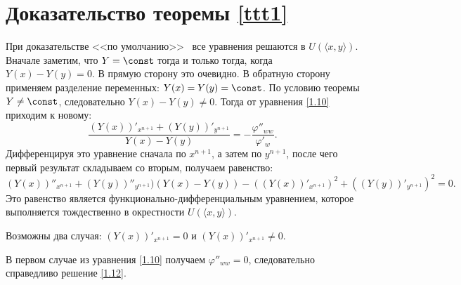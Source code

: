 \section{Доказательство теоремы \ref{ttt1}}
При доказательстве <<по умолчанию>> \ все уравнения решаются в $U(\langle x,y\rangle)$. Вначале заметим, что $Y=\const$ тогда и только тогда, когда $Y(x) - Y(y)=0$. В прямую сторону это очевидно. В обратную сторону применяем разделение переменных: $Y(x) = Y(y)=\const$.
По условию теоремы $Y\ne\const$, следовательно $Y(x) - Y(y)\ne0$. Тогда от уравнения \eqref{1.10} приходим к новому:
\begin{equation}\label{3.1} \dfrac{(Y(x))'_{x^{n+1}} + (Y(y))'_{y^{n+1}}}{Y(x) - Y(y)} = -\dfrac{\varphi''_{ww}}{\varphi'_{w}}. \end{equation} Дифференцируя это уравнение сначала по $x^{n+1}$, а затем по $y^{n+1}$, после чего первый результат складываем со вторым, получаем равенство:
\begin{equation}\label{3.2} (Y(x))''_{x^{n+1}} + (Y(y))''_{y^{n+1}})(Y(x) - Y(y)) - ((Y(x))'_{x^{n+1}})^2 + ((Y(y))'_{y^{n+1}})^2=0. \end{equation}
Это равенство является функционально-дифференциальным уравнением, которое выполняется тождественно в окрестности $U(\langle x,y\rangle)$.

Возможны два случая: $(Y(x))'_{x^{n+1}} = 0$ и $(Y(x))'_{x^{n+1}}\ne0$.

В первом случае из уравнения \eqref{1.10} получаем $\varphi''_{ww}= 0$, следовательно справедливо решение \eqref{1.12}.

